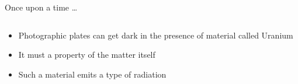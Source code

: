 \begin{frame}{Once upon a time \ldots}
\begin{columns}[T]
\begin{column}{.5\textwidth}
\begin{minipage}[c][.6\textheight][c]{\linewidth}
            \begin{itemize}
               \item Photographic plates can get dark in the presence of material called Uranium
\item It must a property of the matter itself
\item Such a material emits a type of radiation	
            \end{itemize}
          \end{minipage}    
    
    
    \end{column}
    
    
\end{columns}


\end{frame}


